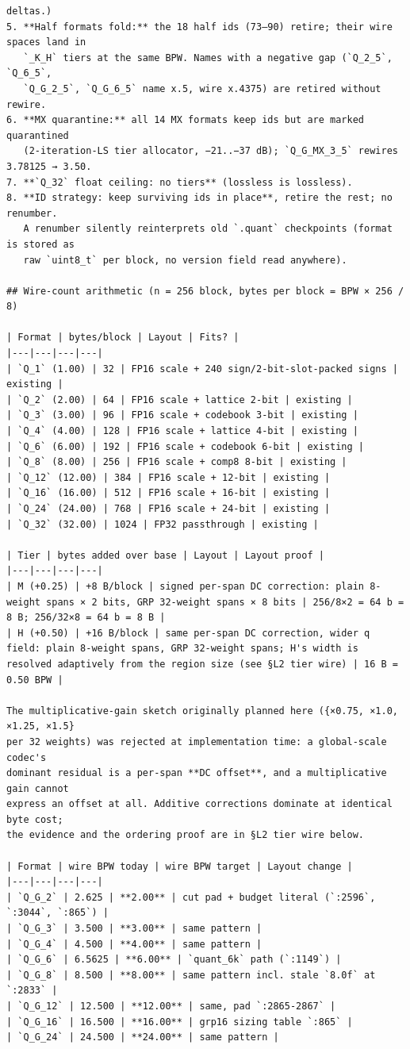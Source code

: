 \begin{Verbatim}[breaklines,breakanywhere,fontsize=\footnotesize]
   deltas.)
5. **Half formats fold:** the 18 half ids (73–90) retire; their wire spaces land in
   `_K_H` tiers at the same BPW. Names with a negative gap (`Q_2_5`, `Q_6_5`,
   `Q_G_2_5`, `Q_G_6_5` name x.5, wire x.4375) are retired without rewire.
6. **MX quarantine:** all 14 MX formats keep ids but are marked quarantined
   (2-iteration-LS tier allocator, −21..−37 dB); `Q_G_MX_3_5` rewires 3.78125 → 3.50.
7. **`Q_32` float ceiling: no tiers** (lossless is lossless).
8. **ID strategy: keep surviving ids in place**, retire the rest; no renumber.
   A renumber silently reinterprets old `.quant` checkpoints (format is stored as
   raw `uint8_t` per block, no version field read anywhere).

## Wire-count arithmetic (n = 256 block, bytes per block = BPW × 256 / 8)

| Format | bytes/block | Layout | Fits? |
|---|---|---|---|
| `Q_1` (1.00) | 32 | FP16 scale + 240 sign/2-bit-slot-packed signs | existing |
| `Q_2` (2.00) | 64 | FP16 scale + lattice 2-bit | existing |
| `Q_3` (3.00) | 96 | FP16 scale + codebook 3-bit | existing |
| `Q_4` (4.00) | 128 | FP16 scale + lattice 4-bit | existing |
| `Q_6` (6.00) | 192 | FP16 scale + codebook 6-bit | existing |
| `Q_8` (8.00) | 256 | FP16 scale + comp8 8-bit | existing |
| `Q_12` (12.00) | 384 | FP16 scale + 12-bit | existing |
| `Q_16` (16.00) | 512 | FP16 scale + 16-bit | existing |
| `Q_24` (24.00) | 768 | FP16 scale + 24-bit | existing |
| `Q_32` (32.00) | 1024 | FP32 passthrough | existing |

| Tier | bytes added over base | Layout | Layout proof |
|---|---|---|---|
| M (+0.25) | +8 B/block | signed per-span DC correction: plain 8-weight spans × 2 bits, GRP 32-weight spans × 8 bits | 256/8×2 = 64 b = 8 B; 256/32×8 = 64 b = 8 B |
| H (+0.50) | +16 B/block | same per-span DC correction, wider q field: plain 8-weight spans, GRP 32-weight spans; H's width is resolved adaptively from the region size (see §L2 tier wire) | 16 B = 0.50 BPW |

The multiplicative-gain sketch originally planned here ({×0.75, ×1.0, ×1.25, ×1.5}
per 32 weights) was rejected at implementation time: a global-scale codec's
dominant residual is a per-span **DC offset**, and a multiplicative gain cannot
express an offset at all. Additive corrections dominate at identical byte cost;
the evidence and the ordering proof are in §L2 tier wire below.

| Format | wire BPW today | wire BPW target | Layout change |
|---|---|---|---|
| `Q_G_2` | 2.625 | **2.00** | cut pad + budget literal (`:2596`, `:3044`, `:865`) |
| `Q_G_3` | 3.500 | **3.00** | same pattern |
| `Q_G_4` | 4.500 | **4.00** | same pattern |
| `Q_G_6` | 6.5625 | **6.00** | `quant_6k` path (`:1149`) |
| `Q_G_8` | 8.500 | **8.00** | same pattern incl. stale `8.0f` at `:2833` |
| `Q_G_12` | 12.500 | **12.00** | same, pad `:2865-2867` |
| `Q_G_16` | 16.500 | **16.00** | grp16 sizing table `:865` |
| `Q_G_24` | 24.500 | **24.00** | same pattern |


\end{Verbatim}
